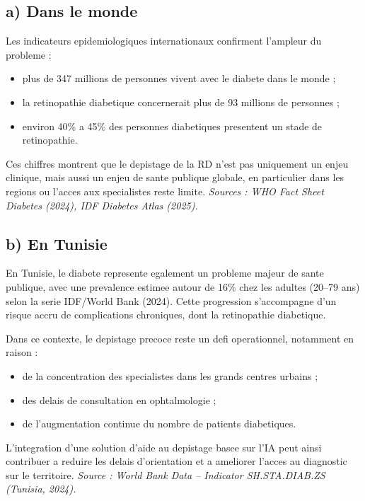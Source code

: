 \subsection{a) Dans le monde}
Les indicateurs epidemiologiques internationaux confirment l'ampleur du probleme :
\begin{itemize}
    \item plus de 347 millions de personnes vivent avec le diabete dans le monde ;
    \item la retinopathie diabetique concernerait plus de 93 millions de personnes ;
    \item environ 40\% a 45\% des personnes diabetiques presentent un stade de retinopathie.
\end{itemize}

Ces chiffres montrent que le depistage de la RD n'est pas uniquement un enjeu clinique,
mais aussi un enjeu de sante publique globale, en particulier dans les regions ou
l'acces aux specialistes reste limite.
\textit{Sources : WHO Fact Sheet Diabetes (2024), IDF Diabetes Atlas (2025).}

\subsection{b) En Tunisie}
En Tunisie, le diabete represente egalement un probleme majeur de sante publique,
avec une prevalence estimee autour de 16\% chez les adultes (20--79 ans) selon la serie
IDF/World Bank (2024). Cette progression s'accompagne d'un risque accru de complications
chroniques, dont la retinopathie diabetique.

Dans ce contexte, le depistage precoce reste un defi operationnel, notamment en raison :
\begin{itemize}
    \item de la concentration des specialistes dans les grands centres urbains ;
    \item des delais de consultation en ophtalmologie ;
    \item de l'augmentation continue du nombre de patients diabetiques.
\end{itemize}

L'integration d'une solution d'aide au depistage basee sur l'IA peut ainsi contribuer
a reduire les delais d'orientation et a ameliorer l'acces au diagnostic sur le territoire.
\textit{Source : World Bank Data -- Indicator SH.STA.DIAB.ZS (Tunisia, 2024).}

